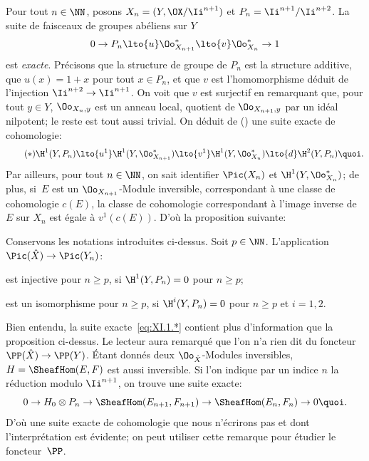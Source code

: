 Pour tout $n\in\NN$, posons $X_n = (Y, \OX/\Ii^{n+1})$ et $P_n = \Ii^{n+1}/\Ii^{n+2}$. La suite de faisceaux de groupes ab\'eliens sur $Y$
\begin{equation} \label{eq:XI.1.1} 0\to P_n\lto{u}\Oo_{X_{n+1}}^*\lto{v}\Oo_{X_n}^*\to 1
\end{equation}
est \emph{exacte}. Pr\'ecisons que la structure de groupe de $P_n$ est la structure additive, que $u(x)=1+x$ pour tout $x\in P_n$, et que $v$ est l'homomorphisme d\'eduit de l'injection $\Ii^{n+2}\to\Ii^{n+1}$. On voit que $v$ est surjectif en remarquant que, pour tout $y \in Y$, $\Oo_{X_n, y}$ est un anneau local, quotient de $\Oo_{X_{n+1}, y}$ par un id\'eal nilpotent; le reste est tout aussi trivial. On d\'eduit de () une suite exacte de cohomologie:
\begin{equation*} \label{eq:XI.1.*} \tag{$*$}
\H^1(Y, P_n)\lto{u^1}\H^1(Y, \Oo_{X_{n+1}}^*)\lto{v^1} \H^1(Y, \Oo_{X_n}^*)\lto{d}\H^2(Y, P_n){\quoi}.
\end{equation*}
Par ailleurs, pour tout $n\in\NN$, on sait identifier $\Pic(X_n)$ et $\H^1(Y, \Oo_{X_n}^*)$; de plus, si~$E$ est un $\Oo_{X_{n+1}}$-Module inversible, correspondant \`a une classe de cohomologie $c(E)$\pageoriginale, la classe de cohomologie correspondant \`a l'image inverse de $E$ sur $X_n$ est \'egale \`a $v^1(c(E))$. D'o\`u la proposition suivante:

\begin{proposition} \label{XI.1.1} Conservons les notations introduites ci-dessus. Soit $p\in\NN$. L'application $\Pic(\hat X)\to \Pic(Y_n)$:
\begin{enumeratei}
\item
est injective pour $n\geq p$, si $\H^1(Y, P_n)=0$ pour $n\geq p$;
\item
est un isomorphisme pour $n\geq p$, si $\H^i(Y, P_n)=0$ pour $n\geq p$ et $i=1, 2$.
\end{enumeratei}
\end{proposition}

Bien entendu, la suite exacte~\eqref{eq:XI.1.*} contient plus d'information que la proposition ci-dessus. Le lecteur aura remarqu\'e que l'on n'a rien dit du foncteur $\PP(\hat X)\to\PP(Y)$. \'Etant donn\'es deux $\Oo_{\hat X}$-Modules inversibles, $H=\SheafHom(E, F)$ est aussi inversible. Si l'on indique par un indice $n$ la r\'eduction modulo $\Ii^{n+1}$, on trouve une suite exacte:
\[
0\to H_0\otimes P_n \to \SheafHom(E_{n+1}, F_{n+1}) \to \SheafHom(E_n, F_n)\to 0{\quoi}.
\]
D'o\`u une suite exacte de cohomologie que nous n'\'ecrirons pas et dont l'interpr\'etation est \'evidente; on peut utiliser cette remarque pour \'etudier le foncteur~$\PP$.

